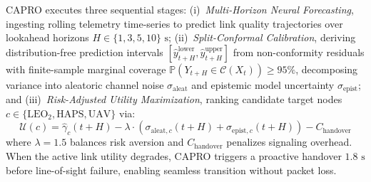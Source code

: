 \documentclass[a4paper]{article}
\begin{document}
CAPRO executes three sequential stages: (i)~\textit{Multi-Horizon Neural Forecasting}, ingesting rolling telemetry time-series to predict link quality trajectories over lookahead horizons $H \in \{1, 3, 5, 10\}\text{ s}$; (ii)~\textit{Split-Conformal Calibration}, deriving distribution-free prediction intervals $[\hat{y}_{t+H}^{\text{lower}}, \hat{y}_{t+H}^{\text{upper}}]$ from non-conformity residuals with finite-sample marginal coverage $\mathbb{P}(Y_{t+H} \in \mathcal{C}(X_t)) \ge 95\%$, decomposing variance into aleatoric channel noise $\sigma_{\text{aleat}}$ and epistemic model uncertainty $\sigma_{\text{epist}}$; and (iii)~\textit{Risk-Adjusted Utility Maximization}, ranking candidate target nodes $c \in \{\text{LEO}_2, \text{HAPS}, \text{UAV}\}$ via:
\begin{equation}
  \mathcal{U}(c) = \hat{\gamma}_c(t+H) - \lambda \cdot (\sigma_{\text{aleat}, c}(t+H) + \sigma_{\text{epist}, c}(t+H)) - C_{\text{handover}}
\end{equation}
where $\lambda = 1.5$ balances risk aversion and $C_{\text{handover}}$ penalizes signaling overhead. When the active link utility degrades, CAPRO triggers a proactive handover $1.8\text{ s}$ before line-of-sight failure, enabling seamless transition without packet loss.

\clearpage %
\end{document}
